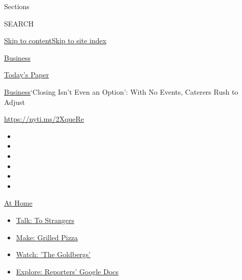 Sections

SEARCH

\protect\hyperlink{site-content}{Skip to
content}\protect\hyperlink{site-index}{Skip to site index}

\href{https://www.nytimes3xbfgragh.onion/section/business}{Business}

\href{https://myaccount.nytimes3xbfgragh.onion/auth/login?response_type=cookie\&client_id=vi}{}

\href{https://www.nytimes3xbfgragh.onion/section/todayspaper}{Today's
Paper}

\href{/section/business}{Business}\textbar{}`Closing Isn't Even an
Option': With No Events, Caterers Rush to Adjust

\url{https://nyti.ms/2XqueRe}

\begin{itemize}
\item
\item
\item
\item
\item
\item
\end{itemize}

\href{https://www.nytimes3xbfgragh.onion/spotlight/at-home?action=click\&pgtype=Article\&state=default\&region=TOP_BANNER\&context=at_home_menu}{At
Home}

\begin{itemize}
\tightlist
\item
  \href{https://www.nytimes3xbfgragh.onion/2020/08/03/well/family/the-benefits-of-talking-to-strangers.html?action=click\&pgtype=Article\&state=default\&region=TOP_BANNER\&context=at_home_menu}{Talk:
  To Strangers}
\item
  \href{https://www.nytimes3xbfgragh.onion/2020/08/01/at-home/coronavirus-make-pizza-on-a-grill.html?action=click\&pgtype=Article\&state=default\&region=TOP_BANNER\&context=at_home_menu}{Make:
  Grilled Pizza}
\item
  \href{https://www.nytimes3xbfgragh.onion/2020/07/31/arts/television/goldbergs-abc-stream.html?action=click\&pgtype=Article\&state=default\&region=TOP_BANNER\&context=at_home_menu}{Watch:
  'The Goldbergs'}
\item
  \href{https://www.nytimes3xbfgragh.onion/interactive/2020/at-home/even-more-reporters-editors-diaries-lists-recommendations.html?action=click\&pgtype=Article\&state=default\&region=TOP_BANNER\&context=at_home_menu}{Explore:
  Reporters' Google Docs}
\end{itemize}

